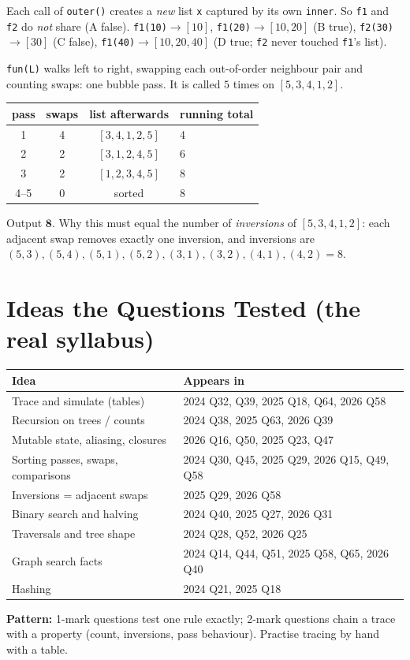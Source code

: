 \documentclass[11pt,a4paper]{article}
\newcommand{\py}[1]{\texttt{#1}}
\begin{document}
\begin{example}
Each call of \py{outer()} creates a \emph{new} list \py{x} captured by its own \py{inner}. So \py{f1} and \py{f2} do \emph{not} share (A false). \py{f1(10)}$\to[10]$, \py{f1(20)}$\to[10,20]$ (B true), \py{f2(30)}$\to[30]$ (C false), \py{f1(40)}$\to[10,20,40]$ (D true; \py{f2} never touched \py{f1}'s list).
\end{example}

\begin{example}
\py{fun(L)} walks left to right, swapping each out-of-order neighbour pair and counting swaps: one bubble pass. It is called $5$ times on $[5,3,4,1,2]$.
\begin{center}
\begin{tabular}{cccl}\toprule
pass & swaps & list afterwards & running total\\\midrule
1 & 4 & $[3,4,1,2,5]$ & 4\\
2 & 2 & $[3,1,2,4,5]$ & 6\\
3 & 2 & $[1,2,3,4,5]$ & 8\\
4--5 & 0 & sorted & 8\\\bottomrule
\end{tabular}
\end{center}
Output $\mathbf{8}$. Why this must equal the number of \emph{inversions} of $[5,3,4,1,2]$: each adjacent swap removes exactly one inversion, and inversions are $(5,3),(5,4),(5,1),(5,2),(3,1),(3,2),(4,1),(4,2)=8$.
\end{example}

\section{Ideas the Questions Tested (the real syllabus)}
\begin{center}\small
\begin{tabularx}{\textwidth}{lX}\toprule
Idea & Appears in\\\midrule
Trace and simulate (tables) & 2024 Q32, Q39, 2025 Q18, Q64, 2026 Q58\\
Recursion on trees / counts & 2024 Q38, 2025 Q63, 2026 Q39\\
Mutable state, aliasing, closures & 2026 Q16, Q50, 2025 Q23, Q47\\
Sorting passes, swaps, comparisons & 2024 Q30, Q45, 2025 Q29, 2026 Q15, Q49, Q58\\
Inversions = adjacent swaps & 2025 Q29, 2026 Q58\\
Binary search and halving & 2024 Q40, 2025 Q27, 2026 Q31\\
Traversals and tree shape & 2024 Q28, Q52, 2026 Q25\\
Graph search facts & 2024 Q14, Q44, Q51, 2025 Q58, Q65, 2026 Q40\\
Hashing & 2024 Q21, 2025 Q18\\\bottomrule
\end{tabularx}
\end{center}
\textbf{Pattern:} 1-mark questions test one rule exactly; 2-mark questions chain a trace with a property (count, inversions, pass behaviour). Practise tracing by hand with a table.
\end{document}

